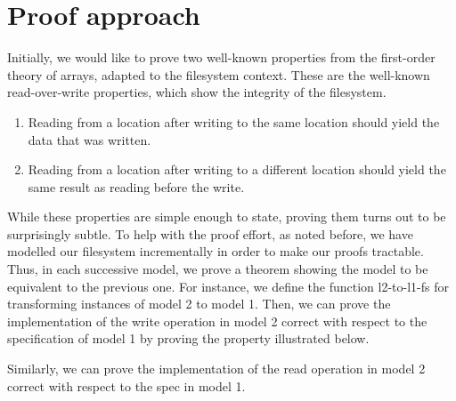 \documentclass[format=sigconf,review=true]{acmart}
\begin{document}
\section {Proof approach}

Initially, we would like to prove two well-known properties from the
first-order theory of arrays, adapted to the filesystem context. These
are the well-known read-over-write properties, which show the
integrity of the filesystem.

\begin {enumerate}
\item Reading from a location after writing to the same location
  should yield the data that was written.
\item Reading from a location after writing to a different
  location should yield the same result as reading before the write.
\end {enumerate}

While these properties are simple enough to state, proving them turns
out to be surprisingly subtle. To help with the proof effort, as noted
before, we have modelled our filesystem incrementally in order to make
our proofs tractable. Thus, in each successive model, we prove a
theorem showing the model to be equivalent to the previous one.
For instance, we define the function l2-to-l1-fs for transforming
instances of model 2 to model 1. Then, we can prove the implementation
of the write operation in model 2 correct with respect to the
specification of model 1 by proving the property illustrated below.


Similarly, we can prove the implementation of the read operation in
model 2 correct with respect to the spec in model 1.

\end{document}
